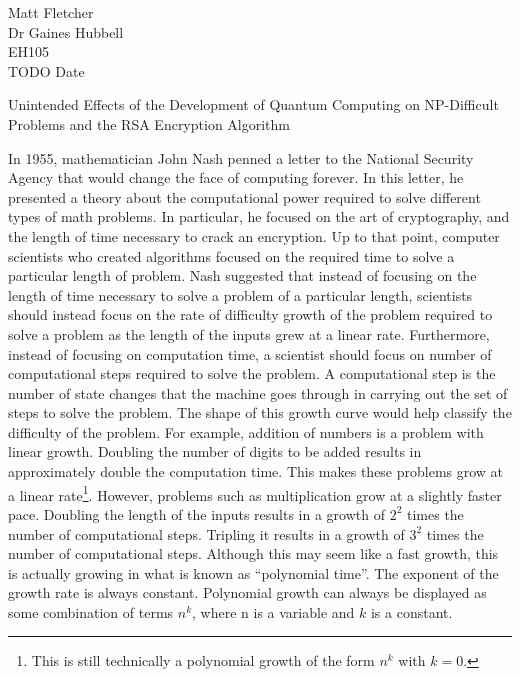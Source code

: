 \documentclass[12pt]{article}
\begin{document}
\begin{flushleft}

Matt Fletcher\\
Dr Gaines Hubbell\\
EH105\\
TODO Date\\


\begin{center}
Unintended Effects of the Development of Quantum Computing on NP-Difficult Problems and the RSA Encryption Algorithm
\end{center}


\setlength{\parindent}{0.5in}



In 1955, mathematician John Nash penned a letter to the National Security Agency that would change the face of computing forever. In this letter, he presented a theory about the computational power required to solve different types of math problems. In particular, he focused on the art of cryptography, and the length of time necessary to crack an encryption. Up to that point, computer scientists who created algorithms focused on the required time to solve a particular length of problem. Nash suggested that instead of focusing on the length of time necessary to solve a problem of a particular length, scientists should instead focus on the rate of difficulty growth of the problem required to solve a problem as the length of the inputs grew at a linear rate. Furthermore, instead of focusing on computation time, a scientist should focus on number of computational steps required to solve the problem. A computational step is the number of state changes that the machine goes through in carrying out the set of steps to solve the problem. The shape of this growth curve would help classify the difficulty of the problem. For example, addition of numbers is a problem with linear growth. Doubling the number of digits to be added results in approximately double the computation time. This makes these problems grow at a linear rate\footnote{This is still technically a polynomial growth of the form $n^k$ with $k=0$.}.  However, problems such as multiplication grow at a slightly faster pace. Doubling the length of the inputs results in a growth of $2^2$ times the number of computational steps. Tripling it results in a growth of $3^2$ times the number of computational steps. Although this may seem like a fast growth, this is actually growing in what is known as “polynomial time”. The exponent of the growth rate is always constant. Polynomial growth can always be displayed as some combination of terms $n^k$, where n is a variable and $k$ is a constant.


\end{flushleft}
\end{document}
